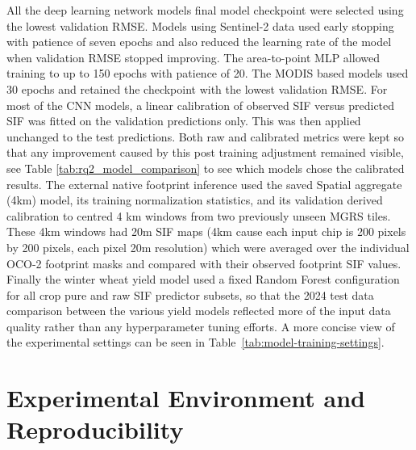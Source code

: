 All the deep learning network models final model checkpoint were selected using the lowest validation RMSE. Models using Sentinel-2 data used early stopping with patience of seven epochs and also reduced the learning rate of the model when validation RMSE stopped improving. The area-to-point MLP allowed training to up to 150 epochs with patience of 20. The MODIS based models used 30 epochs and retained the checkpoint with the lowest validation RMSE. For most of the CNN models, a linear calibration of observed SIF versus predicted SIF was fitted on the validation predictions only. This was then applied unchanged to the test predictions. Both raw and calibrated metrics were kept so that any improvement caused by this post training adjustment remained visible, see Table \ref{tab:rq2_model_comparison} to see which models chose the calibrated results. The external native footprint inference used the saved Spatial aggregate (4km) model, its training normalization statistics, and its validation derived calibration to centred 4 km windows from two previously unseen MGRS tiles. These 4km windows had 20m SIF maps (4km cause each input chip is 200 pixels by 200 pixels, each pixel 20m resolution) which were averaged over the individual OCO-2 footprint masks and compared with their observed footprint SIF values. Finally the winter wheat yield model used a fixed Random Forest configuration for all crop pure and raw SIF predictor subsets, so that the 2024 test data comparison between the various yield models reflected more of the input data quality rather than any hyperparameter tuning efforts. A more concise view of the experimental settings can be seen in Table~\ref{tab:model-training-settings}.









\section{Experimental Environment and Reproducibility}

